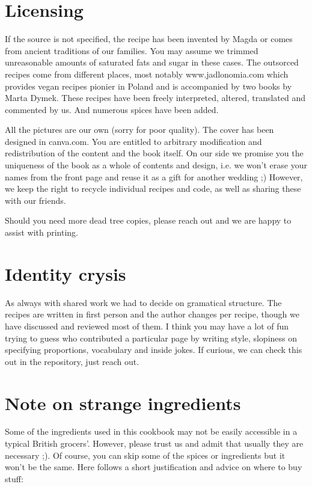 \section*{Licensing}
If the source is not specified, the recipe has been invented by Magda or comes from
ancient traditions of our families.
You may assume we trimmed unreasonable amounts of saturated fats and sugar in these cases.
The outsorced recipes come from different places, most notably www.jadlonomia.com which
provides vegan recipes pionier in Poland and is accompanied by two books by Marta Dymek.
These recipes have been freely interpreted, altered, translated and commented by us. And numerous spices have been added.

All the pictures are our own (sorry for poor quality).
The cover has been designed in canva.com.
You are entitled to arbitrary modification and redistribution of the content and the book itself.
On our side we promise you the uniqueness of the book as a whole of contents and design,
i.e. we won't erase your names from the front page and reuse it as a gift for another wedding ;)
However, we keep the right to recycle individual recipes and code,
as well as sharing these with our friends.

Should you need more dead tree copies, please reach out and we are happy to assist with printing.

\section*{Identity crysis}
As always with shared work we had to decide on gramatical structure.
The recipes are written in first person and the author changes per recipe,
though we have discussed and reviewed most of them.
I think you may have a lot of fun trying to guess who contributed a particular page
by writing style, slopiness on specifying proportions, vocabulary and inside jokes.
If curious, we can check this out in the repository, just reach out.

\section*{Note on strange ingredients}

Some of the ingredients used in this cookbook may not be easily accessible in a typical British grocers'. However, please trust us and admit that usually they are necessary ;). Of course, you can skip some of the spices or ingredients but it won't be the same. Here follows a short justification and advice on where to buy stuff: 

